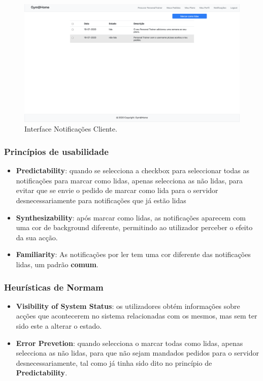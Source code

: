 \begin{figure}[H]
    \centering
    \includegraphics[scale=0.25]{images/interfaces/client_notifications.png}
    \caption{Interface Notificações Cliente.}
    \label{fig:interfacenotificacoescliente}
\end{figure}

\subsubsection{Princípios de usabilidade}
\begin{itemize}
    \item \textbf{Predictability}: quando se selecciona a checkbox para seleccionar todas as notificações para marcar como lidas, apenas selecciona as não lidas, para evitar que se envie o pedido de marcar como lida para o servidor desnecessariamente para notificações que já estão lidas
    \item \textbf{Synthesizability}: após marcar como lidas, as notificações aparecem com uma cor de background diferente, permitindo ao utilizador perceber o efeito da sua acção.
    \item \textbf{Familiarity}: As notificações por ler tem uma cor diferente das notificações lidas, um padrão \textbf{comum}.

\end{itemize}

\subsubsection{Heurísticas de Normam}
\begin{itemize}
    \item \textbf{Visibility of System Status}: os utilizadores obtém informações sobre acções que acontecerem no sistema relacionadas com os mesmos, mas sem ter sido este a alterar o estado.
    \item \textbf{Error Prevetion}: quando selecciona o marcar todas como lidas, apenas selecciona as não lidas, para que não sejam mandados pedidos para o servidor desnecessariamente, tal como já tinha sido dito no princípio de \textbf{Predictability}.
\end{itemize}

